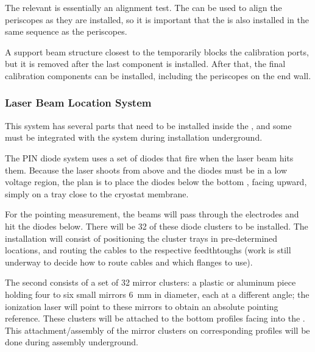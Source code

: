 The relevant  is essentially an alignment test.
The  can be used to align the periscopes as they are installed, so it is important that the  is also installed in the same sequence as the periscopes.





A support beam structure closest to the  temporarily blocks the calibration ports, but it is removed after the last  component is installed. After that, the final calibration components can be installed, including the periscopes on the  end wall. 

\subsubsection{Laser Beam Location System}
This system has several parts that need to be installed inside the , and some must be integrated with the 
 system during installation underground. 

The PIN diode system uses a set of diodes that fire when the laser beam hits them. Because the laser shoots from above and the diodes must be in a low voltage region, the plan is to place the diodes below the bottom , facing upward, simply on a tray close to the cryostat membrane.

For the pointing measurement, the beams will pass through the  electrodes and hit the diodes below. There will be \num{32} of these diode clusters to be installed. The installation will consist of positioning the cluster trays in pre-determined locations, and routing the cables to the respective feedthtoughs (work is still underway to decide how to route cables and which flanges to use). 

The second  consists of a set of \num{32} mirror clusters: a plastic or aluminum piece holding four to six small mirrors \SI{6}{\mm} in diameter, each at a different angle; the ionization laser will point to these mirrors to obtain an absolute pointing reference. These clusters will be attached to the bottom  profiles facing into the . 
This attachment/assembly of the mirror clusters on corresponding  profiles will be done during  assembly underground.



